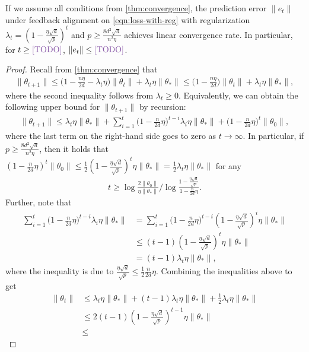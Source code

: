 \begin{corollary}\label{cor:convergence-with-decreasing-reg}
    If we assume all conditions from \cref{thm:convergence}, the prediction error $\|e_t\|$ under feedback alignment on \eqref{eqn:loss-with-reg} with regularization $\lambda_t = \left(1-\frac{\eta\sqrt{d}}{\sqrt{p}}\right)^t$ and $p \geq \frac{8d^2\sqrt{d}}{n^2\eta}$ achieves linear convergence rate. In particular, for $t\geq \icomment{TODO}$, $\|e_t\| \leq \icomment{TODO}$.
\end{corollary}

\begin{proof}
    Recall from \cref{thm:convergence} that 
    \begin{align*}
        \|\theta_{t+1}\| \leq \Big(1-\frac{n\eta}{2d}- \lambda_t\eta \Big)\|\theta_t\| + \lambda_t\eta\|\theta_\ast\| \leq \Big(1-\frac{n\eta}{2d} \Big)\|\theta_t\| + \lambda_t\eta\|\theta_\ast\|,
    \end{align*}
    where the second inequality follows from $\lambda_t\geq 0$. Equivalently, we can obtain the following upper bound for $\|\theta_{t+1}\|$ by recursion:
    \begin{align*}
        \|\theta_{t+1}\| \leq \lambda_t\eta \|\theta_*\| + \sum_{i=1}^t \Big( 1-\frac{n}{2d}\eta \Big)^{t-i} \lambda_i\eta \|\theta_*\| + \Big( 1-\frac{n}{2d}\eta \Big)^t \|\theta_0\|,
    \end{align*}
    where the last term on the right-hand side goes to zero as $t\to\infty$. In particular, if $p \geq \frac{8d^2\sqrt{d}}{n^2\eta}$, then it holds that $\left( 1-\frac{n}{2d}\eta \right)^t \|\theta_0\| \leq \frac{1}{2} \left( 1-\frac{\eta\sqrt{d}}{\sqrt{p}} \right)^t \eta \|\theta_*\| = \frac{1}{2}\lambda_t\eta \|\theta_*\|$ for any 
    \begin{align*}
        t \geq \log\frac{2\|\theta_0\|}{\eta\|\theta_*\|} / \log \frac{1-\frac{\eta\sqrt{d}}{\sqrt{p}}}{1 - \frac{n}{2d}\eta}.
    \end{align*}
    Further, note that 
    \begin{align*}
        \sum_{i=1}^t \Big( 1-\frac{n}{2d}\eta \Big)^{t-i} \lambda_i\eta \|\theta_*\| & = \sum_{i=1}^t \Big( 1-\frac{n}{2d}\eta \Big)^{t-i} \left(1-\frac{\eta\sqrt{d}}{\sqrt{p}}\right)^i \eta \|\theta_*\| \\
        & \leq (t-1) \left(1-\frac{\eta\sqrt{d}}{\sqrt{p}}\right)^t \eta \|\theta_*\| \\
        & = (t-1)\lambda_t\eta \|\theta_*\|,
    \end{align*}
    where the inequality is due to $\frac{\eta\sqrt{d}}{\sqrt{p}} \leq \frac{1}{2}\frac{n}{2d}\eta$. Combining the inequalities above to get
    \begin{align*}
        \|\theta_t\| & \leq  \lambda_t\eta \|\theta_*\| + (t-1)\lambda_t\eta \|\theta_*\| + \frac{1}{2}\lambda_t\eta \|\theta_*\| \\
        & \leq 2(t-1) \left(1-\frac{\eta\sqrt{d}}{\sqrt{p}}\right)^{t-1} \eta \|\theta_*\| \\
        & \leq 
    \end{align*}
\end{proof}


